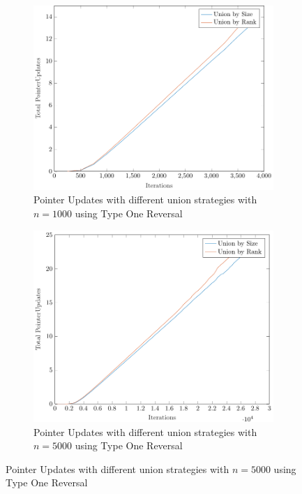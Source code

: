 \begin{figure}[ht]
    \begin{subfigure}{0.32\textwidth}
        \centering
        \includegraphics[width=\textwidth]{../images/plotTORNonFull1000_PointerUpdates.pdf}
        \caption{Pointer Updates with different union strategies with $n = 1000$ using Type One Reversal}
    \end{subfigure}%
    \hfill
    \begin{subfigure}{0.32\textwidth}
        \centering
        \includegraphics[width=\textwidth]{../images/plotTORNonFull5000_PointerUpdates.pdf}
        \caption{Pointer Updates with different union strategies with $n = 5000$ using Type One Reversal}

\end{subfigure}
\end{figure}
